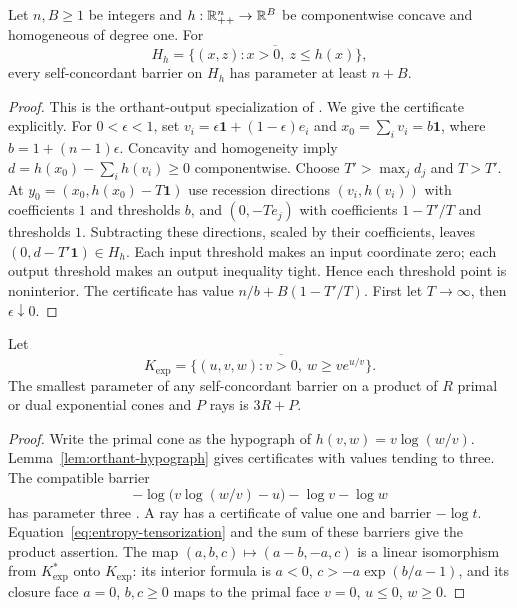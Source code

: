 \begin{lemma}\label{lem:orthant-hypograph}
Let $n,B\geq1$ be integers and $h:\mathbb R_{++}^n\to\mathbb R^B$ be componentwise concave and homogeneous of degree
one.  For
\[
 H_h=\overline{\{(x,z):x>0,\ z\leq h(x)\}},
\]
every self-concordant barrier on $H_h$ has parameter at least $n+B$.
\end{lemma}
\begin{proof}
This is the orthant-output specialization of
\citet[Theorem 3.10]{FS2023}.  We give the certificate explicitly.
For $0<\epsilon<1$, set $v_i=\epsilon\mathbf1+(1-\epsilon)e_i$ and
$x_0=\sum_i v_i=b\mathbf1$, where $b=1+(n-1)\epsilon$.
Concavity and homogeneity imply
$d=h(x_0)-\sum_i h(v_i)\geq0$ componentwise.
Choose $T'>\max_j d_j$ and $T>T'$.  At
$y_0=(x_0,h(x_0)-T\mathbf1)$ use recession directions
$(v_i,h(v_i))$ with coefficients $1$ and thresholds $b$, and
$(0,-Te_j)$ with coefficients $1-T'/T$ and thresholds $1$.
Subtracting these directions, scaled by their coefficients, leaves
$(0,d-T'\mathbf1)\in H_h$.
Each input threshold makes an input coordinate zero; each output
threshold makes an output inequality tight.  Hence each threshold point
is noninterior.  The certificate has value
$n/b+B(1-T'/T)$.  First let $T\to\infty$, then $\epsilon\downarrow0$.
\end{proof}

\begin{theorem}\label{thm:entropy-product}
Let
\[
 K_{\exp}=\overline{\{(u,v,w):v>0,\ w\geq ve^{u/v}\}}.
\]
The smallest parameter of any self-concordant barrier on a product of
$R$ primal or dual exponential cones and $P$ rays is $3R+P$.
\end{theorem}
\begin{proof}
Write the primal cone as the hypograph of $h(v,w)=v\log(w/v)$.
Lemma~\ref{lem:orthant-hypograph} gives certificates with values
tending to three.
The compatible barrier
\[
 -\log\bigl(v\log(w/v)-u\bigr)-\log v-\log w
\]
has parameter three \citep{FS2023}.  A ray has a certificate of value one
and barrier $-\log t$.  Equation~\eqref{eq:entropy-tensorization} and the
sum of these barriers give the product assertion.
The map $(a,b,c)\mapsto(a-b,-a,c)$ is a linear isomorphism from
$K_{\exp}^*$ onto $K_{\exp}$: its interior formula is
$a<0$, $c>-a\exp(b/a-1)$, and its closure face $a=0$, $b,c\geq0$
maps to the primal face $v=0$, $u\leq0$, $w\geq0$.
\end{proof}

